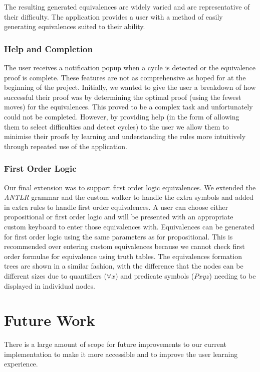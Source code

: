 \documentclass[draft]{report}
\begin{document}
The resulting generated equivalences are widely varied and are representative of their difficulty. The application provides a user with a method of easily generating equivalences suited to their ability.

\subsubsection{Help and Completion}

The user receives a notification popup when a cycle is detected or the equivalence proof is complete. These features are not as comprehensive as hoped for at the beginning of the project. Initially, we wanted to give the user a breakdown of how successful their proof was by determining the optimal proof (using the fewest moves) for the equivalences. This proved to be a complex task and unfortunately could not be completed. However, by providing help (in the form of allowing them to select difficulties and detect cycles) to the user we allow them to minimise their proofs by learning and understanding the rules more intuitively through repeated use of the application.

\subsubsection{First Order Logic}

Our final extension was to support first order logic equivalences. We extended the \emph{ANTLR} grammar and the custom walker to handle the extra symbols and added in extra rules to handle first order equivalences. A user can choose either propositional or first order logic and will be presented with an appropriate custom keyboard to enter those equivalences with. Equivalences can be generated for first order logic using the same parameters as for propositional. This is recommended over entering custom equivalences because we cannot check first order formulae for equivalence using truth tables. The equivalences formation trees are shown in a similar fashion, with the difference that the nodes can be different sizes due to quantifiers ($\forall x$) and predicate symbols ($Pxyz$) needing to be displayed in individual nodes.

\section{Future Work}

There is a large amount of scope for future improvements to our current implementation to make it more accessible and to improve the user learning experience.
\end{document}
